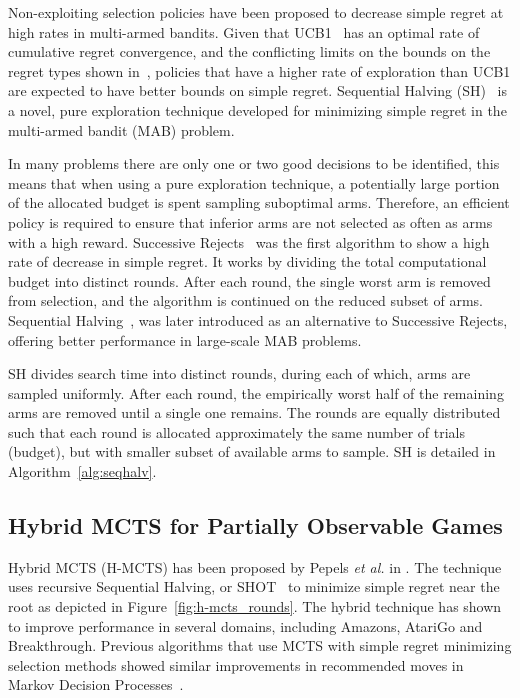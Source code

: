 \documentclass[a4paper]{llncs}
\begin{document}
Non-exploiting selection policies have been proposed to decrease simple regret at high rates in multi-armed bandits. Given that UCB1~\cite{auer2002using} has an optimal rate of cumulative regret convergence, and the conflicting limits on the bounds on the regret types shown in~\cite{Bubeck11Pure}, policies that have a higher rate of exploration than UCB1 are expected to have better bounds on simple regret. Sequential Halving (SH)~\cite{Karnin13SH} is a novel, pure exploration technique developed for minimizing simple regret in the multi-armed bandit (MAB) problem.

In many problems there are only one or two good decisions to be identified, this means that when using a pure exploration technique, a potentially large portion of the allocated budget is spent sampling suboptimal arms. Therefore, an efficient policy is required to ensure that inferior arms are not selected as often as arms with a high reward. Successive Rejects~\cite{audibert2010best} was the first algorithm to show a high rate of decrease in simple regret. It works by dividing the total computational budget into distinct rounds. After each round, the single worst arm is removed from selection, and the algorithm is continued on the reduced subset of arms. Sequential Halving~\cite{Karnin13SH}, was later introduced as an alternative to Successive Rejects, offering better performance in large-scale MAB problems.

SH divides search time into distinct rounds, during each of which, arms are sampled uniformly. After each round, the empirically worst half of the remaining arms are removed until a single one remains. The rounds are equally distributed such that each round is allocated approximately the same number of trials (budget), but with smaller subset of available arms to sample. SH is detailed in Algorithm~\ref{alg:seqhalv}.

\subsection{Hybrid MCTS for Partially Observable Games}
\label{subsec:h-mcts_po}

Hybrid MCTS (H-MCTS) has been proposed by Pepels \emph{et al.} in \cite{Pepels14hmcts}. The technique uses recursive Sequential Halving, or SHOT~\cite{Cazenave14SHOT} to minimize simple regret near the root as depicted in Figure~\ref{fig:h-mcts_rounds}. The hybrid technique has shown to improve performance in several domains, including Amazons, AtariGo and Breakthrough. Previous algorithms that use MCTS with simple regret minimizing selection methods showed similar improvements in recommended moves in Markov Decision Processes~\cite{Feldman12BRUE,tolpin2012mcts}.
\end{document}
